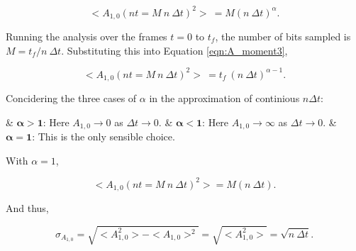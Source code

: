 \begin{description}
					\begin{equation}
						<A_{1,0}(nt = M\ n\ \Delta t)^2>\ = M (n\ \Delta t)^\alpha.
						\label{eqn:A_moment3}
					\end{equation}

					Running the analysis over the frames $t = 0$ to $t_f$, the number of bits sampled is $M = {t_f / n\ \Delta t}$. Substituting this into Equation \ref{eqn:A_moment3},

					\begin{equation}
						<A_{1,0}(nt = M\ n\ \Delta t)^2>\ = t_f\ (n\ \Delta t)^{\alpha -1}.
					\end{equation}

					Concidering the three cases of $\alpha$ in the approximation of continious $n \Delta t$:
					
					\vspace{1em}

					\begin{easylist}[itemize]
						& $\bm{\alpha > 1}$: Here $A_{1,0} \to 0$ as $\Delta t \to 0$.
						& $\bm{\alpha < 1}$: Here $A_{1,0} \to \infty$ as $\Delta t \to 0$.
						& $\bm{\alpha = 1}$: This is the only sensible choice.
					\end{easylist}
					
					\vspace{1em}

					With $\alpha =1$,

					\begin{equation}
						<A_{1,0}(nt = M\ n\ \Delta t)^2> = M (n\ \Delta t).
					\end{equation}

					And thus,

					\begin{equation}
						\sigma_{A_{1,0}} = \sqrt{<A_{1,0}^2> - <A_{1,0}>^2} = \sqrt{<A_{1,0}^2>} = \sqrt{n\ \Delta t}.
					\end{equation}

			\end{description}	

